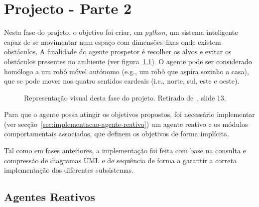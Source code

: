 \chapter{Projecto - Parte 2}\label{ch:projeto-parte2}

Nesta fase do projeto, o objetivo foi criar, em \textit{python}, um sistema inteligente capaz de se movimentar num espaço com dimensões fixas onde existem obstáculos.
A finalidade do agente prospetor é recolher os alvos e evitar os obstáculos presentes no ambiente (ver figura~\ref{fig:agente-prospetor}).
O agente pode ser considerado homólogo a um robô móvel autónomo (e.g., um robô que aspira sozinho a casa), que se pode mover nos quatro sentidos cardeais (i.e., norte, sul, este e oeste).

\begin{figure}[H]
    \begin{center}
    \end{center}
    \caption{Representação visual desta fase do projeto.
    Retirado de~\cite{isel:iasa:slides:arq-agentes-reativos-parte-2}, slide 13.}\label{fig:agente-prospetor}
\end{figure}

Para que o agente possa atingir os objetivos propostos, foi necessário implementar (ver secção~\ref{sec:implementacao-agente-reativo}) um agente reativo e os módulos comportamentais associados, que definem os objetivos de forma implícita.

Tal como em fases anteriores, a implementação foi feita com base na consulta e compressão de diagramas UML e de sequência de forma a garantir a correta implementação dos diferentes subsistemas.


\section{Agentes Reativos}\label{sec:agentes-reativos}

